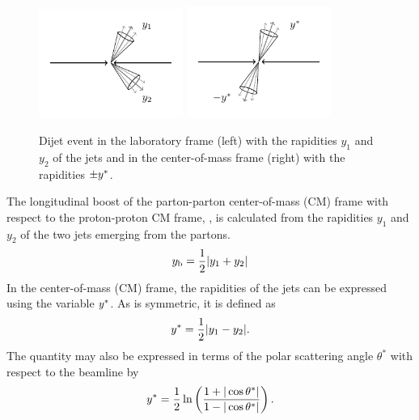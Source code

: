 \begin{figure}[htbp]
    \centering
    \includegraphics[width=0.42\textwidth]{figures/drawings/dijet_lab.pdf}
    \includegraphics[width=0.42\textwidth]{figures/drawings/dijet_cm.pdf}
    \caption[Dijet event in laboratory and center-of-mass frame.]
        {Dijet event in the laboratory frame (left) with the rapidities $y_1$
        and $y_2$ of the jets and in the center-of-mass frame (right) with the
    rapidities $\pm y^{*}$.}
    \label{fig:dijet_cm_lab_frame}
\end{figure}

The longitudinal boost of the parton-parton center-of-mass (CM) frame with
respect to the proton-proton CM frame, \yboost, is calculated from the
rapidities $y_1$ and $y_2$ of the two jets emerging from the partons. 
%
\begin{equation*}
    y_{\mathrm{b}} = \frac{1}{2} |y_1 + y_2|
\end{equation*}
%
In the center-of-mass (CM) frame, the rapidities of the jets can be expressed
using the variable $y^{*}$. As \ystar is symmetric, it is defined as
%
\begin{equation*}
    y^{*} = \frac{1}{2} |y_1 - y_2|.
\end{equation*}
%
The quantity \ystar may also be expressed in terms of the polar scattering angle
$\theta^*$ with respect to the beamline by 
%
\begin{equation*}
    y^{*} = \frac{1}{2} \ln \left( \frac{1 + |\cos \theta^*|}{1- | \cos \theta^*|} \right).
\end{equation*}

